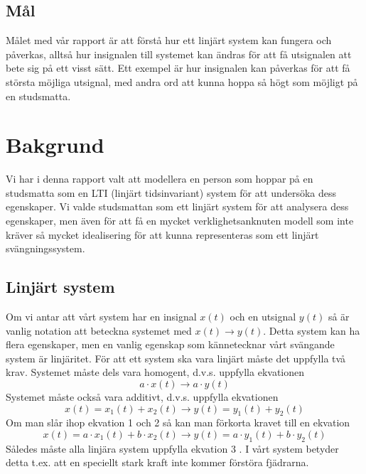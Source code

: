 \documentclass[10pt,a4paper]{article}
\begin{document}
\subsection{Mål}
Målet med vår rapport är att förstå hur ett linjärt system kan fungera och påverkas, alltså hur insignalen till systemet kan ändras för att få utsignalen att bete sig på ett visst sätt. Ett exempel är hur insignalen kan påverkas för att få största möjliga utsignal, med andra ord att kunna hoppa så högt som möjligt på en studsmatta.

\section{Bakgrund}

Vi har i denna rapport valt att modellera en person som hoppar på en studsmatta som en LTI (linjärt tidsinvariant) system för att undersöka dess egenskaper. Vi valde studsmattan som ett linjärt system för att analysera dess egenskaper, men även för att få en mycket verklighetsanknuten modell som inte kräver så mycket idealisering för att kunna representeras som ett linjärt svängningssystem.
\newpage

\subsection{Linjärt system}

Om vi antar att vårt system har en insignal $x(t)$ och en utsignal $y(t)$ så är vanlig notation att beteckna systemet med $x(t) \rightarrow y(t)$. Detta system kan ha flera egenskaper, men en vanlig egenskap som kännetecknar vårt svängande system är linjäritet. För att ett system ska vara linjärt måste det uppfylla två krav. Systemet måste dels vara homogent, d.v.s. uppfylla ekvationen
\begin{equation}
a \cdot x(t) \rightarrow a \cdot y(t) 
\end{equation}
Systemet måste också vara additivt, d.v.s. uppfylla ekvationen
\begin{equation}
x(t) = x_1(t) + x_2(t) \rightarrow y(t) = y_1(t) + y_2(t)
\end{equation}
Om man slår ihop ekvation 1 och 2 så kan man förkorta kravet till en ekvation
\begin{equation}
x(t) = a \cdot x_1(t) + b \cdot x_2(t)\rightarrow y(t) = a \cdot y_1(t) + b \cdot y_2(t)
\end{equation}
\linebreak
Således måste alla linjära system uppfylla ekvation 3 \cite{sune2000}.
I vårt system betyder detta t.ex. att en speciellt stark kraft inte kommer förstöra fjädrarna.
\end{document}
